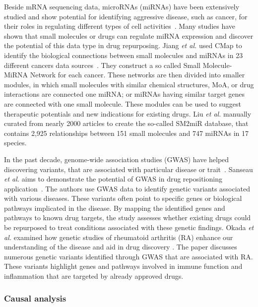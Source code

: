 \documentclass[Minh_PhD_thesis.tex]{subfiles}
\begin{document}
Beside mRNA sequencing data, microRNAs (miRNAs) have been extensively studied and show potential for identifying aggressive disease, such as cancer, for their roles in regulating different types of cell activities~\cite{ding2014micrornas, wen2014micrornas}. Many studies have shown that small molecules or drugs can regulate miRNA expression and discover the potential of this data type in drug repurposing.
Jiang \textit{et al.} used CMap to identify the biological connections between small
molecules and miRNAs in 23 different cancers data sources~\cite{jiang2012identification}. They construct a so called Small Molecule-MiRNA Network for each cancer. These networks are then divided into smaller modules, in which small molecules with similar chemical structures, MoA, or drug interactions are connected one miRNA; or miRNAs having similar target genes are connected with one small molecule. These modules can be used to suggest therapeutic potentials and new indications for existing drugs.
Liu \textit{et al.} \cite{liu2013sm2mir} manually curated from nearly 2000 articles to create the so-called SM2miR database, that contains 2,925 relationships between 151 small molecules and 747 miRNAs in 17 species.

In the past decade, genome-wide association studies (GWAS) have helped discovering variants, that are associated with particular disease or trait~\cite{visscher2012five, hebbring2014challenges}. Sanseau \textit{et al.} aims to demonstrate the potential of GWAS in drug repositioning application~\cite{sanseau2012use}. The authors use GWAS data to identify genetic variants associated with various diseases. These variants often point to specific genes or biological pathways implicated in the disease. By mapping the identified genes and pathways to known drug targets, the study assesses whether existing drugs could be repurposed to treat conditions associated with these genetic findings. Okada \textit{et al.} examined how genetic studies of rheumatoid arthritis (RA) enhance our understanding of the disease and aid in drug discovery \cite{okada2014genetics}. The paper discusses numerous genetic variants identified through GWAS that are associated with RA. These variants highlight genes and pathways involved in immune function and inflammation that are targeted by already approved drugs.


\subsubsection{Causal analysis}
\end{document}
